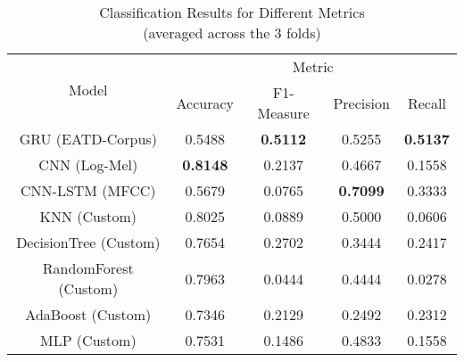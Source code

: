 
\begin{table}[!t]
    \centering
    \caption{Classification Results for Different Metrics \\ (averaged across the 3 folds)}
    \scriptsize
    \begin{tabular}{|c|c|c|c|c|}
    \hline
    \multirow{2}{*}{Model} & \multicolumn{4}{c|}{Metric} \\ \cline{2-5} 
    & Accuracy & F1-Measure & Precision & Recall \\ \hline
    GRU (EATD-Corpus) & 0.5488 & \textbf{0.5112} & 0.5255 & \textbf{0.5137} \\ 
    CNN (Log-Mel) & \textbf{0.8148} & 0.2137 & 0.4667 & 0.1558 \\ 
    CNN-LSTM (MFCC) & 0.5679 & 0.0765 & \textbf{0.7099} & 0.3333 \\ 
    KNN (Custom) & 0.8025 & 0.0889 & 0.5000 & 0.0606 \\ 
    DecisionTree (Custom) & 0.7654 & 0.2702 & 0.3444 & 0.2417 \\ 
    RandomForest (Custom) & 0.7963 & 0.0444 & 0.4444 & 0.0278 \\ 
    AdaBoost (Custom) & 0.7346 & 0.2129 & 0.2492 & 0.2312 \\ 
    MLP (Custom) & 0.7531 & 0.1486 & 0.4833 & 0.1558 \\ \hline
    \end{tabular}
    \label{table:results}
\end{table}
